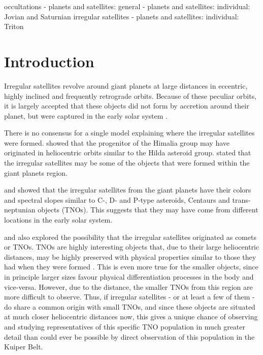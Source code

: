 \documentclass[useAMS,usenatbib]{mn2e}
\begin{document}
\begin{keywords}
occultations - planets and satellites: general - planets and satellites: individual: Jovian and Saturnian irregular satellites - planets and satellites: individual: Triton
\end{keywords}

\section{Introduction}\label{Sec: introducao}

Irregular satellites revolve around giant planets at large distances in eccentric, highly inclined and frequently retrograde orbits. Because of these peculiar orbits, it is largely accepted that these objects did not form by accretion around their planet, but were captured in the early solar system \citep{Sheppard2005}.

There is no consensus for a single model explaining where the irregular satellites were formed. \cite{Cuk2004} showed that the progenitor of the Himalia group may have originated in heliocentric orbits similar to the Hilda asteroid group. \cite{Sheppard2005} stated that the irregular satellites may be some of the objects that were formed within the giant planets region.

\cite{Grav2003} and \cite{Grav2007} showed that the irregular satellites from the giant planets have their colors and spectral slopes similar to C-, D- and P-type asteroids, Centaurs and trans-neptunian objects (TNOs). This suggests that they may have come from different locations in the early solar system.

\cite{Sheppard2005} and \cite{Jewitt2007} also explored the possibility that the irregular satellites originated as comets or TNOs. TNOs are highly interesting objects that, due to their large heliocentric distances, may be highly preserved with physical properties similar to those they had when they were formed \citep{Barucci2008}. This is even more true for the smaller objects, since in principle larger sizes favour physical differentiation processes in the body and vice-versa. However, due to the distance, the smaller TNOs from this region are more difficult to observe. Thus, if irregular satellites - or at least a few of them - do share a common origin with small TNOs, and since these objects are situated at much closer heliocentric distances now, this gives a unique chance of observing and studying representatives of this specific TNO population in much greater detail than could ever be possible by direct observation of this population in the Kuiper Belt. 
\end{document}
